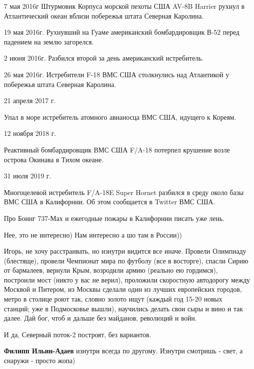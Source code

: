 \begin{itemize}
\begin{itemize}
\end{itemize} %


7 мая 2016г Штурмовик Корпуса морской пехоты США AV-8B Harrier рухнул в
Атлантический океан вблизи побережья штата Северная Каролина.

19 мая 2016г. Рухнувший на Гуаме американский бомбардировщик В-52 перед
падением на землю загорелся.

2 июня 2016г. Разбился второй за день американский истребитель.

26 мая 2016г. Истребители F-18 ВМС США столкнулись над Атлантикой у побережья
штата Северная Каролина.

21 апреля 2017 г.

Упал в море истребитель атомного авианосца ВМС США, идущего к Кореям.

12 ноября 2018 г.

Реактивный бомбардировщик ВМС США F/A-18 потерпел крушение возле острова
Окинава в Тихом океане.

31 июля 2019 г.

Многоцелевой истребитель F/A-18E Super Hornet разбился в среду около базы ВМС
США в Калифорнии. Об этом сообщается в Twitter ВМС США.

Про Боинг 737-Мах и ежегодные пожары в Калифорнии писать уже лень.

\begin{itemize} %
Нее, это не интересно) Нам интересно а шо там в России))
\end{itemize} %


Игорь, не хочу расстраивать, но изнутри видится все иначе. Провели Олимпиаду
(блестяще), провели Чемпионат мира по футболу (все в восторге), спасли Сирию от
бармалеев, вернули Крым, возродили армию (реально ею гордимся), построили мост
(никто у вас не верил), проложили скоростную автодорогу между Москвой и
Питером, из Москвы сделали один из лучших европейских городов, метро в столице
роют так, словно золото ищут (каждый год 15-20 новых станций; уже в Подмосковье
вышли), научились делать свои сыры и вино и так далее. Дай бог, чтоб и дальше
без майданов, революций и войн.

И да, Северный поток-2 построят, без вариантов.

\begin{itemize} %
\textbf{Филипп Ильин-Адаев} изнутри всегда по другому. Изнутри смотришь - свет, а снаружи - просто жопа)


\end{itemize}
\end{itemize}
